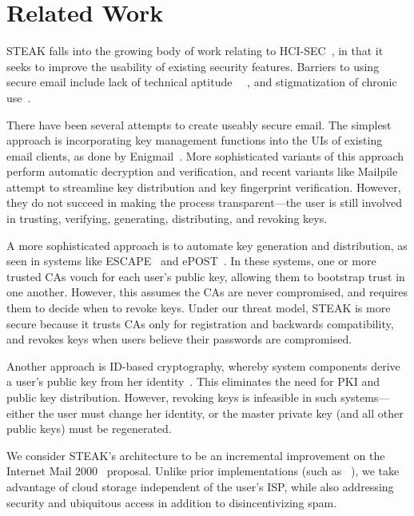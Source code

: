 \section{Related Work}

STEAK falls into the growing body of work relating to HCI-SEC~\cite{hci-sec},
in that it seeks to improve the usability of existing security features.  Barriers
to using secure email include lack of technical aptitude~\cite{why-jonny-cant-encrypt}
~\cite{garfinkel-email-survey}, and
stigmatization of chronic use~\cite{crypto-adoption-criteria}.

There have been several attempts to create useably secure email.
The simplest approach is incorporating key management functions into the 
UIs of existing email clients, as done by Enigmail~\cite{enigmail}.
More sophisticated variants of this approach perform automatic decryption
and verification, and recent variants like Mailpile~\cite{mailpile} attempt
to streamline key distribution and key fingerprint verification.  However, they do not
succeed in making the process transparent---the user is still involved in
trusting, verifying, generating, distributing, and revoking keys.

A more sophisticated approach is to automate key generation and distribution,
as seen in systems like ESCAPE~\cite{escape} and ePOST~\cite{epost}.
In these systems, one or more trusted CAs vouch for each user's public key,
allowing them to bootstrap trust in one another.  However, this assumes
the CAs are never compromised, and requires them to decide when to revoke keys.
Under our threat model, STEAK is more secure because it trusts
CAs only for registration and backwards compatibility, and revokes keys when users believe 
their passwords are compromised.

Another approach is ID-based cryptography, whereby system components
derive a user's public key from her identity~\cite{id-cryptography}.  This 
eliminates the need for PKI and public key distribution.  However,
revoking keys is infeasible in such systems---either the user must change 
her identity, or the master private key (and all other public keys) must be 
regenerated.

We consider STEAK's architecture to be an incremental improvement on
the Internet Mail 2000~\cite{im2k} proposal.  Unlike prior implementations
(such as ~\cite{stubmail}), we take advantage of cloud storage 
independent of the user's ISP, while also addressing security and ubiquitous
access in addition to disincentivizing spam.
